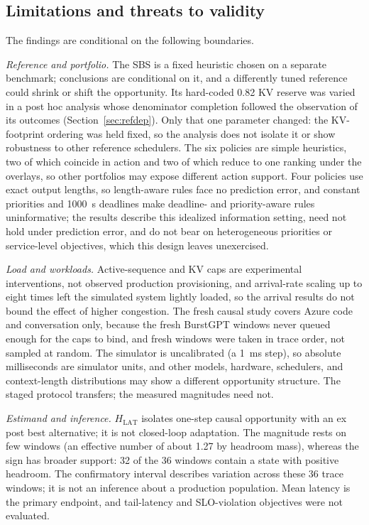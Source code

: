 \documentclass[preprint,12pt]{elsarticle}
\begin{document}
\subsection{Limitations and threats to validity}
The findings are conditional on the following boundaries.

\emph{Reference and portfolio.} The SBS is a fixed heuristic chosen on a separate
benchmark; conclusions are conditional on it, and a differently tuned reference
could shrink or shift the opportunity. Its hard-coded 0.82 KV reserve was varied
in a post hoc analysis whose denominator completion followed the observation of
its outcomes (Section~\ref{sec:refdep}). Only that one parameter changed: the
KV-footprint ordering was held fixed, so the analysis does not isolate it or show
robustness to other reference schedulers. The six policies are simple heuristics,
two of which coincide in action and two of which reduce to one ranking under the
overlays, so other portfolios may expose different action support. Four policies
use exact output lengths, so length-aware rules face no prediction error, and
constant priorities and 1000~s deadlines make deadline- and priority-aware rules
uninformative; the results describe this idealized information setting, need not
hold under prediction error, and do not bear on heterogeneous priorities or
service-level objectives, which this design leaves unexercised.

\emph{Load and workloads.} Active-sequence and KV caps are experimental
interventions, not observed production provisioning, and arrival-rate scaling up
to eight times left the simulated system lightly loaded, so the arrival results
do not bound the effect of higher congestion. The fresh causal study covers
Azure code and conversation only, because the fresh BurstGPT windows never
queued enough for the caps to bind, and fresh windows were taken in trace order,
not sampled at random. The simulator is uncalibrated (a 1~ms step), so absolute
milliseconds are simulator units, and other models, hardware, schedulers, and
context-length distributions may show a different opportunity structure. The
staged protocol transfers; the measured magnitudes need not.

\emph{Estimand and inference.} $H_{\mathrm{LAT}}$ isolates one-step causal
opportunity with an ex post best alternative; it is not closed-loop adaptation.
The magnitude rests on few windows (an effective number of about 1.27 by
headroom mass), whereas the sign has broader support: 32 of the 36 windows
contain a state with positive headroom. The confirmatory interval describes
variation across these 36 trace windows; it is not an inference about a
production population. Mean latency is the primary endpoint,
and tail-latency and SLO-violation objectives were not evaluated.
\end{document}
